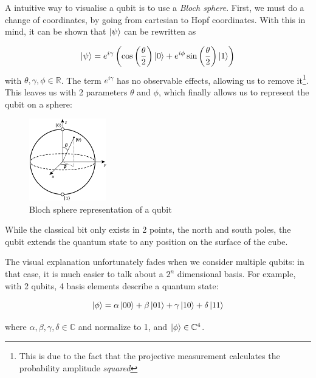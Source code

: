 \documentclass[12pt]{memoir}
\newcommand{\ti}{\textit}
\begin{document}
A intuitive way to visualise a qubit is to use a \ti{Bloch sphere}. First, we must do a change of coordinates, by going from cartesian to Hopf coordinates. With this in mind, it can be shown that $\ket \psi$ can be rewritten as

\begin{equation}
    \ket \psi = e^{i\gamma}\left( \cos\left(\frac{\theta}{2}\right)\ket 0 + e^{i\phi} \sin\left(\frac{\theta}{2}\right)\ket 1\right)
\end{equation}
with $\theta,\gamma,\phi \in \mathbb{R}$. The term $e^{i\gamma}$ has no observable effects, allowing us to remove it\footnote{This is due to the fact that the projective measurement calculates the probability amplitude \textit{squared}}. This leaves us with 2 parameters $\theta$ and $\phi$, which finally allows us to represent the qubit on a sphere:

\begin{figure}[H]
    \centering
    \includegraphics[width=0.3\textwidth]{figures/bloch_sphere.png}
    \caption{Bloch sphere representation of a qubit \cite{wiki:qubit}}
    \label{fig:bloch-sphere}
\end{figure}
While the classical bit only exists in 2 points, the north and south poles, the qubit extends the quantum state to any position on the surface of the cube. \cite{wiki:qubit,book:Nielsen-Chuang-2010}\medbreak

The visual explanation unfortunately fades when we consider multiple qubits: in that case, it is much easier to talk about a $2^n$ dimensional basis. For example, with 2 qubits, 4 basis elements describe a quantum state:

\begin{equation}
    \ket{\phi} = \alpha \ket{00} + \beta \ket{01} + \gamma \ket{10} + \delta \ket{11}
\end{equation}

where $\alpha,\beta,\gamma,\delta \in \mathbb C$ and normalize to 1, and $\ket{\phi} \in \mathbb{C}^4$.\medbreak
\end{document}
